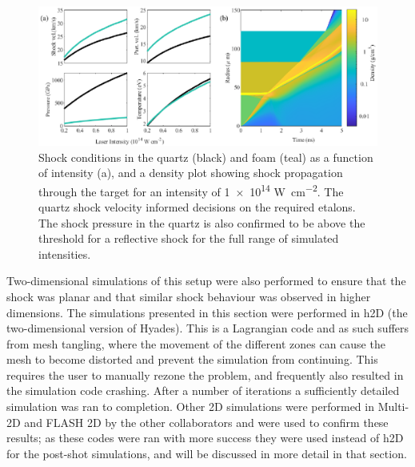 \begin{figure}[hbt!]
\centering
\includegraphics[width=1\textwidth]{figures/Experiment/PreExperimentHydro.eps}%
\caption{\label{fig:PreExpHydro} Shock conditions in the quartz (black) and foam (teal) as a function of intensity (a), and a density plot showing shock propagation through the target for an intensity of \num{1e14} \unit{\W\per\centi\meter\squared}. The quartz shock velocity informed decisions on the required etalons. The shock pressure in the quartz is also confirmed to be above the threshold for a reflective shock for the full range of simulated intensities.}
\end{figure}

Two-dimensional simulations of this setup were also performed to ensure that the shock was planar and that similar shock behaviour was observed in higher dimensions. The simulations presented in this section were performed in h2D (the two-dimensional version of Hyades). This is a Lagrangian code and as such suffers from mesh tangling, where the movement of the different zones can cause the mesh to become distorted and prevent the simulation from continuing. This requires the user to manually rezone the problem, and frequently also resulted in the simulation code crashing. After a number of iterations a sufficiently detailed simulation was ran to completion. Other 2D simulations were performed in Multi-2D and FLASH 2D by the other collaborators and were used to confirm these results; as these codes were ran with more success they were used instead of h2D for the post-shot simulations, and will be discussed in more detail in that section.

